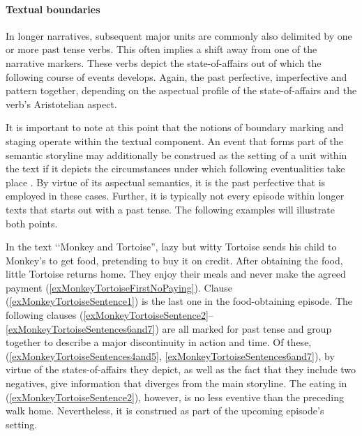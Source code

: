 \paragraph{Textual boundaries}\label{PastPFVNarrativeDiscourseBoundaries}
In longer narratives, subsequent major units are commonly also delimited by one or more past tense verbs. This often implies a shift away from one of the narrative markers. These verbs depict the state-of-affairs out of which the following course of events develops. Again, the past perfective, imperfective and  pattern together, depending on the aspectual profile of the state-of-affairs and the verb's Aristotelian aspect.

It is important to note at this point that the notions of boundary marking and staging operate within the textual component. An event that forms part of the semantic storyline may additionally be construed as the setting of a unit within the text if it depicts the circumstances under which following eventualities take place \citep{PayneD1992}. By virtue of its aspectual semantics, it is the past perfective that is employed in these cases. Further, it is typically not every episode within longer texts that starts out with a past tense. The following examples will illustrate both points.

In the text \lq\lq Monkey and Tortoise'', lazy but witty Tortoise sends his child to Monkey's to get food, pretending to buy it on credit. After obtaining the food, little Tortoise returns home. They enjoy their meals and never make the agreed payment (\ref{exMonkeyTortoiseFirstNoPaying}). Clause (\ref{exMonkeyTortoiseSentence1}) is the last one in the food-obtaining episode. The following clauses (\ref{exMonkeyTortoiseSentence2}--\ref{exMonkeyTortoiseSentences6and7}) are all marked for past tense and group together to describe a major discontinuity in action and time. Of these, (\ref{exMonkeyTortoiseSentences4and5}, \ref{exMonkeyTortoiseSentences6and7}), by virtue of the states-of-affairs they depict, as well as the fact that they include two negatives, give information that diverges from the main storyline. The eating in (\ref{exMonkeyTortoiseSentence2}), however, is no less eventive than the preceding walk home. Nevertheless, it is construed as part of the upcoming episode's setting.

